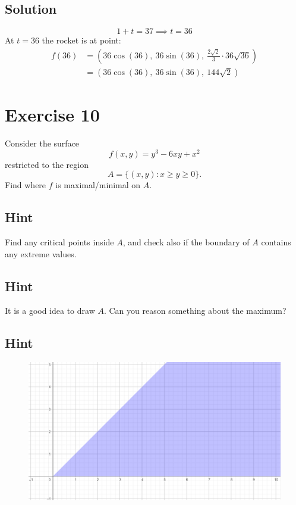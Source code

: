 \documentclass[a4paper,10pt]{article}
\begin{document}
\subsection{Solution}
\[
    1 + t = 37 \implies t = 36
\]
At $t=36$ the rocket is at point:
\begin{align*}
    f(36) & = \left(36\cos(36),\: 36\sin(36),\: \frac{2\sqrt{2}}{3}\cdot 36\sqrt{36}\right) \\
          & = \left(36\cos(36),\: 36\sin(36),\: 144\sqrt{2}\right)
\end{align*}

\clearpage

\section{Exercise 10}

Consider the surface
\[
    f(x,y) = y^3 - 6xy + x^2
\]
restricted to the region
\[
    A = \{(x,y): x \geq y \geq 0\}.
\]
Find where $f$ is maximal/minimal on $A$.

\subsection{Hint}
Find any critical points inside $A$, and check also if the boundary of $A$ contains any extreme values.

\subsection{Hint}
It is a good idea to draw $A$. Can you reason something about the maximum?

\subsection{Hint}

\begin{figure}[!ht]
    \centering
    \includegraphics[scale=0.5]{ex_10.png}
\end{figure}
\end{document}
